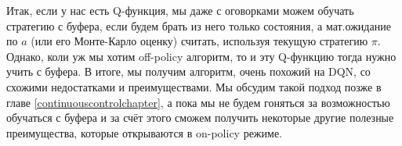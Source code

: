 Итак, если у нас есть Q-функция, мы даже с оговорками можем обучать стратегию с буфера, если будем брать из него только состояния, а мат.ожидание по $a$ (или его Монте-Карло оценку) считать, используя текущую стратегию $\pi$. Однако, коли уж мы хотим off-policy алгоритм, то и эту Q-функцию тогда нужно учить с буфера. В итоге, мы получим алгоритм, очень похожий на DQN, со схожими недостатками и преимуществами. Мы обсудим такой подход позже в главе \ref{continuouscontrolchapter}, а пока мы не будем гоняться за возможностью обучаться с буфера и за счёт этого сможем получить некоторые другие полезные преимущества, которые открываются в on-policy режиме.






